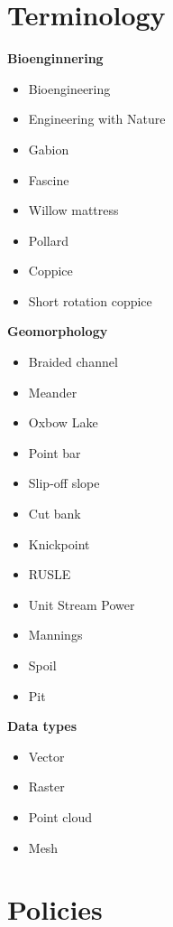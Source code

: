 \documentclass[11pt,article,oneside]{memoir}
\begin{document}
\section{Terminology}
\begin{multicols}{2}
\raggedright
\small
%
\textbf{Bioenginnering}
\begin{itemize}
\item Bioengineering
\item Engineering with Nature
\item Gabion
\item Fascine
\item Willow mattress
\item Pollard
\item Coppice
\item Short rotation coppice
\end{itemize}

\textbf{Geomorphology}
\begin{itemize}
\item Braided channel
\item Meander
\item Oxbow Lake
\item Point bar
\item Slip-off slope
\item Cut bank
\item Knickpoint
\item RUSLE
\item Unit Stream Power
\item Mannings
\item Spoil
\item Pit
\end{itemize}

\textbf{Data types}
\begin{itemize}
\item Vector
\item Raster
\item Point cloud
\item Mesh
\end{itemize}
%
\end{multicols}

\clearpage

\section{Policies}
\end{document}
